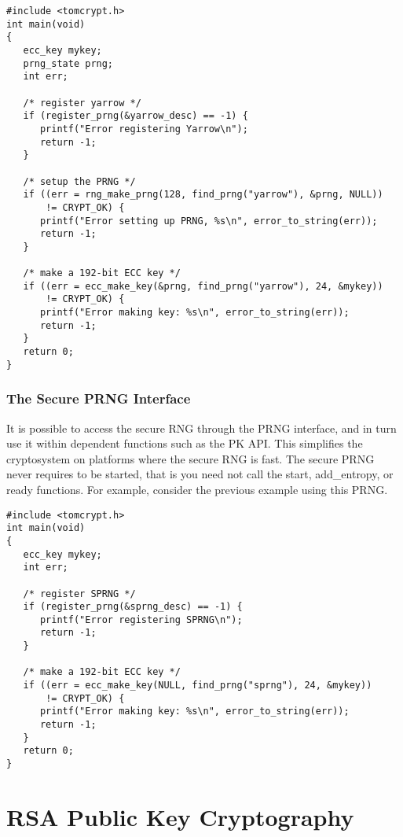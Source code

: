 \documentclass[synpaper]{book}
\begin{document}
\begin{small}
\begin{verbatim}
#include <tomcrypt.h>
int main(void)
{
   ecc_key mykey;
   prng_state prng;
   int err;

   /* register yarrow */
   if (register_prng(&yarrow_desc) == -1) {
      printf("Error registering Yarrow\n");
      return -1;
   }

   /* setup the PRNG */
   if ((err = rng_make_prng(128, find_prng("yarrow"), &prng, NULL)) 
       != CRYPT_OK) {
      printf("Error setting up PRNG, %s\n", error_to_string(err));
      return -1;
   }

   /* make a 192-bit ECC key */
   if ((err = ecc_make_key(&prng, find_prng("yarrow"), 24, &mykey)) 
       != CRYPT_OK) {
      printf("Error making key: %s\n", error_to_string(err));
      return -1;
   }
   return 0;
}
\end{verbatim}
\end{small}

\subsection{The Secure PRNG Interface}
It is possible to access the secure RNG through the PRNG interface, and in turn use it within dependent functions such
as the PK API.  This simplifies the cryptosystem on platforms where the secure RNG is fast.  The secure PRNG never 
requires to be started, that is you need not call the start, add\_entropy, or ready functions.  For example, consider
the previous example using this PRNG.

\begin{small}
\begin{verbatim}
#include <tomcrypt.h>
int main(void)
{
   ecc_key mykey;
   int err;

   /* register SPRNG */
   if (register_prng(&sprng_desc) == -1) {
      printf("Error registering SPRNG\n");
      return -1;
   }

   /* make a 192-bit ECC key */
   if ((err = ecc_make_key(NULL, find_prng("sprng"), 24, &mykey)) 
       != CRYPT_OK) {
      printf("Error making key: %s\n", error_to_string(err));
      return -1;
   }
   return 0;
}
\end{verbatim}
\end{small}

\chapter{RSA Public Key Cryptography}
\end{document}
